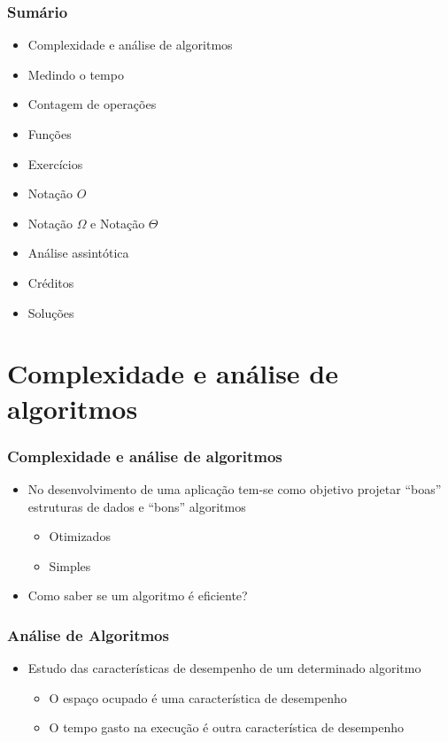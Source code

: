 \documentclass[aspectratio=169]{beamer}
\begin{document}
\begin{frame}\frametitle{Sumário}
\begin{itemize}
	\item Complexidade e análise de algoritmos
	\item Medindo o tempo
	\item Contagem de operações
	\item Funções
	\item Exercícios
	\item Notação $O$
	\item Notação $\Omega$ e Notação $\Theta$
	\item Análise assintótica
	\item Créditos
	\item Soluções
\end{itemize}
\end{frame}

\section{Complexidade e análise de algoritmos}

\begin{frame}\frametitle{Complexidade e análise de algoritmos}
\begin{itemize}
	\item  No desenvolvimento de uma aplicação tem-se como objetivo projetar ``boas'' estruturas de dados e ``bons'' algoritmos
	\begin{itemize}
		\item Otimizados
		\item Simples
	\end{itemize}
	\item Como saber se um algoritmo é eficiente?
\end{itemize}
\end{frame}

\begin{frame}\frametitle{Análise de Algoritmos}
\begin{itemize}
	\item Estudo das características de desempenho de um determinado algoritmo
	\begin{itemize}
		\item O espaço ocupado é uma característica de desempenho
		\item O tempo gasto na execução é outra característica de desempenho
	\end{itemize}
\end{itemize}
\end{frame}
\end{document}
